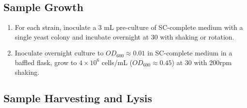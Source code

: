 \documentclass{article}
\newcommand{\mum}{\ensuremath{\mu}m\xspace}
\newcommand{\degC}{\celsius\xspace}
\begin{document}
\subsection*{Sample Growth}
\begin{enumerate}[resume]
\item For each strain, inoculate a 3 mL pre-culture of SC-complete medium with a single yeast colony and incubate overnight at 30\degC with shaking or rotation.
\item Inoculate overnight culture to $OD_{600} \approx 0.01$  in SC-complete medium in a baffled flask, grow to $4 \times 10^6$ cells/mL ($OD_{600} \approx 0.45$) at 30\degC with 200rpm shaking.
\end{enumerate}

\subsection*{Sample Harvesting and  Lysis}
\end{document}
